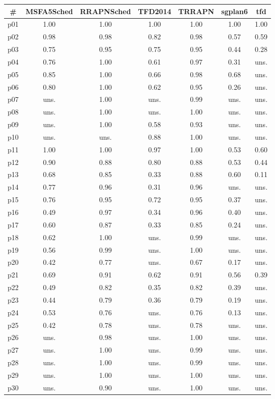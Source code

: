 \begin{tabular}{c||c|c|c|c|c|c}
\textbf{\#} & \textbf{MSFA5Sched} & \textbf{RRAPNSched} & \textbf{TFD2014} & \textbf{TRRAPN} & \textbf{sgplan6} & \textbf{tfd}\\
\hline
\hline
p01 & 1.00 & 1.00 & 1.00 & 1.00 & 1.00 & 1.00\\
p02 & 0.98 & 0.98 & 0.82 & 0.98 & 0.57 & 0.59\\
p03 & 0.75 & 0.95 & 0.75 & 0.95 & 0.44 & 0.28\\
p04 & 0.76 & 1.00 & 0.61 & 0.97 & 0.31 & uns.\\
p05 & 0.85 & 1.00 & 0.66 & 0.98 & 0.68 & uns.\\
p06 & 0.80 & 1.00 & 0.62 & 0.95 & 0.26 & uns.\\
p07 & uns. & 1.00 & uns. & 0.99 & uns. & uns.\\
p08 & uns. & 1.00 & uns. & 1.00 & uns. & uns.\\
p09 & uns. & 1.00 & 0.58 & 0.93 & uns. & uns.\\
p10 & uns. & uns. & 0.88 & 1.00 & uns. & uns.\\
p11 & 1.00 & 1.00 & 0.97 & 1.00 & 0.53 & 0.60\\
p12 & 0.90 & 0.88 & 0.80 & 0.88 & 0.53 & 0.44\\
p13 & 0.68 & 0.85 & 0.33 & 0.88 & 0.60 & 0.11\\
p14 & 0.77 & 0.96 & 0.31 & 0.96 & uns. & uns.\\
p15 & 0.76 & 0.95 & 0.72 & 0.95 & 0.37 & uns.\\
p16 & 0.49 & 0.97 & 0.34 & 0.96 & 0.40 & uns.\\
p17 & 0.60 & 0.87 & 0.33 & 0.85 & 0.24 & uns.\\
p18 & 0.62 & 1.00 & uns. & 0.99 & uns. & uns.\\
p19 & 0.56 & 0.99 & uns. & 1.00 & uns. & uns.\\
p20 & 0.42 & 0.77 & uns. & 0.67 & 0.17 & uns.\\
p21 & 0.69 & 0.91 & 0.62 & 0.91 & 0.56 & 0.39\\
p22 & 0.49 & 0.82 & 0.35 & 0.82 & 0.39 & uns.\\
p23 & 0.44 & 0.79 & 0.36 & 0.79 & 0.19 & uns.\\
p24 & 0.53 & 0.76 & uns. & 0.76 & 0.13 & uns.\\
p25 & 0.42 & 0.78 & uns. & 0.78 & uns. & uns.\\
p26 & uns. & 0.98 & uns. & 1.00 & uns. & uns.\\
p27 & uns. & 1.00 & uns. & 0.99 & uns. & uns.\\
p28 & uns. & 1.00 & uns. & 0.99 & uns. & uns.\\
p29 & uns. & 1.00 & uns. & 1.00 & uns. & uns.\\
p30 & uns. & 0.90 & uns. & 1.00 & uns. & uns.\\
\end{tabular}

